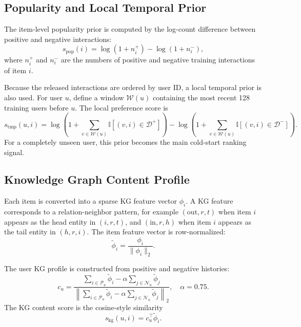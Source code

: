 \documentclass[onecolumn,a4paper,12pt]{IEEEtran}
\begin{document}
\subsection{Popularity and Local Temporal Prior}

The item-level popularity prior is computed by the log-count difference between positive and negative interactions:
\begin{equation}
    s_{\mathrm{pop}}(i)=\log(1+n_i^{+})-\log(1+n_i^{-}),
\end{equation}
where $n_i^{+}$ and $n_i^{-}$ are the numbers of positive and negative training interactions of item $i$.

Because the released interactions are ordered by user ID, a local temporal prior is also used. For user $u$, define a window $\mathcal{W}(u)$ containing the most recent 128 training users before $u$. The local preference score is
\begin{equation}
    s_{\mathrm{tmp}}(u,i)
    =
    \log\left(1+\sum_{v\in\mathcal{W}(u)}\mathbb{I}[(v,i)\in\mathcal{D}^{+}]\right)
    -
    \log\left(1+\sum_{v\in\mathcal{W}(u)}\mathbb{I}[(v,i)\in\mathcal{D}^{-}]\right).
\end{equation}
For a completely unseen user, this prior becomes the main cold-start ranking signal.

\subsection{Knowledge Graph Content Profile}

Each item is converted into a sparse KG feature vector $\phi_i$. A KG feature corresponds to a relation-neighbor pattern, for example $(\mathrm{out},r,t)$ when item $i$ appears as the head entity in $(i,r,t)$, and $(\mathrm{in},r,h)$ when item $i$ appears as the tail entity in $(h,r,i)$. The item feature vector is row-normalized:
\begin{equation}
    \tilde{\phi}_i=\frac{\phi_i}{\|\phi_i\|_2}.
\end{equation}

The user KG profile is constructed from positive and negative histories:
\begin{equation}
    c_u=
    \frac{
    \sum_{i\in\mathcal{P}_u}\tilde{\phi}_i
    -
    \alpha\sum_{j\in\mathcal{N}_u}\tilde{\phi}_j
    }
    {
    \left\|
    \sum_{i\in\mathcal{P}_u}\tilde{\phi}_i
    -
    \alpha\sum_{j\in\mathcal{N}_u}\tilde{\phi}_j
    \right\|_2
    },
    \quad \alpha=0.75.
\end{equation}
The KG content score is the cosine-style similarity
\begin{equation}
    s_{\mathrm{kg}}(u,i)=c_u^\top \tilde{\phi}_i.
\end{equation}
\end{document}
